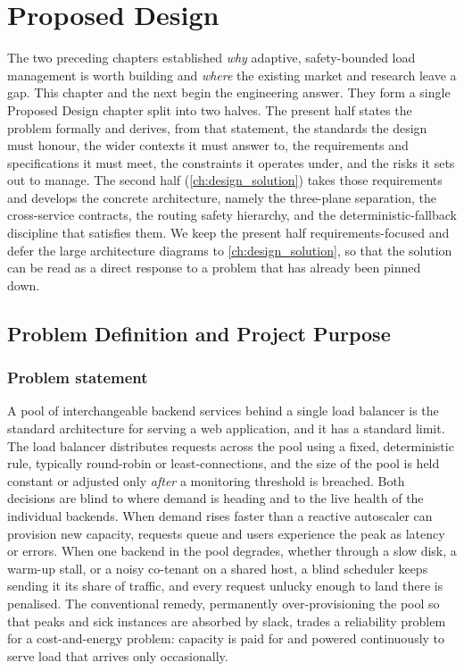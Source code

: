 \chapter{Proposed Design}
\label{ch:design_problem}

The two preceding chapters established \emph{why} adaptive, safety-bounded load
management is worth building and \emph{where} the existing market and research
leave a gap. This chapter and the next begin the engineering answer. They form a
single Proposed Design chapter split into two halves. The present half states the
problem formally and derives, from that statement, the standards the design must
honour, the wider contexts it must answer to, the requirements and specifications
it must meet, the constraints it operates under, and the risks it sets out to
manage. The second half (\cref{ch:design_solution}) takes those requirements and
develops the concrete architecture, namely the three-plane separation, the
cross-service contracts, the routing safety hierarchy, and the
deterministic-fallback discipline that satisfies them. We keep the present
half requirements-focused and defer the large architecture diagrams to
\cref{ch:design_solution}, so that the solution can be read as a direct response
to a problem that has already been pinned down.

\section{Problem Definition and Project Purpose}
\label{dsa:sec:problem}

\subsection{Problem statement}
\label{dsa:sec:problem-statement}

A pool of interchangeable backend services behind a single load balancer is the
standard architecture for serving a web application, and it has a standard limit.
The load balancer distributes requests across the pool using a fixed,
deterministic rule, typically round-robin or least-connections, and the size
of the pool is held constant or adjusted only \emph{after} a monitoring threshold
is breached. Both decisions are blind to where demand is heading and to the live
health of the individual backends. When demand rises faster than a reactive
autoscaler can provision new capacity, requests queue and users experience the
peak as latency or errors. When one backend in the pool degrades, whether through
a slow disk, a warm-up stall, or a noisy co-tenant on a shared host, a blind
scheduler keeps sending it its share of traffic, and every request unlucky enough
to land there is penalised. The conventional remedy, permanently over-provisioning
the pool so that peaks and sick instances are absorbed by slack, trades a
reliability problem for a cost-and-energy problem: capacity is paid for and powered
continuously to serve load that arrives only occasionally.

